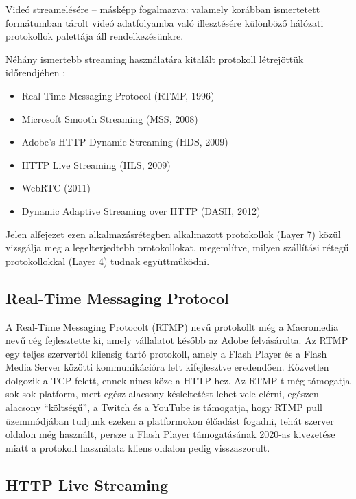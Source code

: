 Videó streamelésére -- másképp fogalmazva: valamely korábban ismertetett formátumban tárolt videó adatfolyamba való illesztésére különböző hálózati protokollok palettája áll rendelkezésünkre.

Néhány ismertebb streaming használatára kitalált protokoll létrejöttük időrendjében \cite{StreamingHistory}:

\begin{itemize}
	\setlength{\itemsep}{1pt}
  \setlength{\parskip}{0pt}
  \setlength{\parsep}{0pt}
	\item Real-Time Messaging Protocol (RTMP, 1996)
	\item Microsoft Smooth Streaming (MSS, 2008)
	\item Adobe's HTTP Dynamic Streaming (HDS, 2009)
	\item HTTP Live Streaming (HLS, 2009)
	\item WebRTC (2011)
	\item Dynamic Adaptive Streaming over HTTP (DASH, 2012)
\end{itemize}

Jelen alfejezet ezen alkalmazásrétegben alkalmazott protokollok (Layer 7) közül vizsgálja meg a legelterjedtebb protokollokat, megemlítve, milyen szállítási rétegű protokollokkal (Layer 4) tudnak együttműködni.

\subsection{Real-Time Messaging Protocol}

A Real-Time Messaging Protocolt (RTMP) nevű protokollt még a Macromedia nevű cég fejlesztette ki, amely vállalatot később az Adobe felvásárolta. Az RTMP egy teljes szervertől kliensig tartó protokoll, amely a Flash Player és a Flash Media Server közötti kommunikációra lett kifejlesztve eredendően. Közvetlen dolgozik a TCP felett, ennek nincs köze a HTTP-hez. \cite{StreamingHistory} Az RTMP-t még támogatja sok-sok platform, mert egész alacsony késleltetést lehet vele elérni, egészen alacsony ``költségű'', a Twitch és a YouTube is támogatja, hogy RTMP pull üzemmódjában tudjunk ezeken a platformokon élőadást fogadni, tehát szerver oldalon még használt, persze a Flash Player támogatásának 2020-as kivezetése miatt a protokoll használata kliens oldalon pedig visszaszorult.

\subsection{HTTP Live Streaming}

